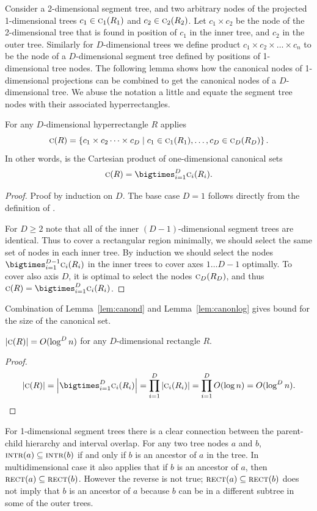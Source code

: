 \documentclass[english,gradu]{tktltiki2018}
\begin{document}
Consider a 2-dimensional segment tree, and two arbitrary nodes of the projected 1-dimensional trees $c_1\in\canoni{R_1}{1}$ and $c_2\in\canoni{R_2}{2}$.
Let $c_1\times c_2$ be the node of the 2-dimensional tree that is found in position of $c_1$ in the inner tree, and $c_2$ in the outer tree.
Similarly for $D$-dimensional trees we define product $c_1\times c_2\times\dots\times c_n$ to be the node of a $D$-dimensional segment tree defined by positions of 1-dimensional tree nodes.
The following lemma shows how the canonical nodes of 1-dimensional projections can be combined to get the canonical nodes of a $D$-dimensional tree.
We abuse the notation a little and equate the segment tree nodes with their associated hyperrectangles.

\begin{lem}\label{lem:canond}
For any $D$-dimensional hyperrectangle $R$ applies
$$\canon{R}=\set{c_1\times c_2\dots\times c_D \mid c_1\in\canoni{R_1}{1}, \dots, c_D\in\canoni{R_D}{D}}.$$
In other words,  is the Cartesian product of one-dimensional canonical sets
$$\canon{R}=\bigtimes_{i=1}^D \canoni{R_i}{i}.$$
\end{lem}
\begin{proof}
Proof by induction on $D$.
The base case $D=1$ follows directly from the definition of .

For $D\ge 2$ note that all of the inner $(D-1)$-dimensional segment trees are identical.
Thus to cover a rectangular region minimally, we should select the same set of nodes in each inner tree.
By induction we should select the nodes $\bigtimes_{i=1}^{D-1} \canoni{R_i}{i}$ in the inner trees to cover axes $1\dots D-1$ optimally.
To cover also axis $D$, it is optimal to select the nodes $\canoni{R_D}{D}$, and thus $\canon{R}=\bigtimes_{i=1}^D\canoni{R_i}{i}$.
\end{proof}

Combination of Lemma~\ref{lem:canond} and Lemma~\ref{lem:canonlog} gives bound for the size of the canonical set.

\begin{cor}$\size{\canon{R}}=O(\log^D\segsize)$ for any $D$-dimensional rectangle $R$.\end{cor}
\begin{proof}
$$
\size{\canon{R}} = \size{\bigtimes_{i=1}^D \canoni{R_i}{i}}
= \prod_{i=1}^D \size{\canoni{R_i}{i}}
= \prod_{i=1}^D O(\log\segsize)
= O(\log^D\segsize).
$$
\end{proof}

For 1-dimensional segment trees there is a clear connection between the parent-child hierarchy and interval overlap.
For any two tree nodes $a$ and $b$, $\inter{a}\subseteq\inter{b}$ if and only if $b$ is an ancestor of $a$ in the tree.
In multidimensional case it also applies that if $b$ is an ancestor of $a$, then $\rect{a}\subseteq\rect{b}$.
However the reverse is not true; $\rect{a}\subseteq\rect{b}$ does not imply that $b$ is an ancestor of $a$ because $b$ can be in a different subtree in some of the outer trees.
\end{document}
